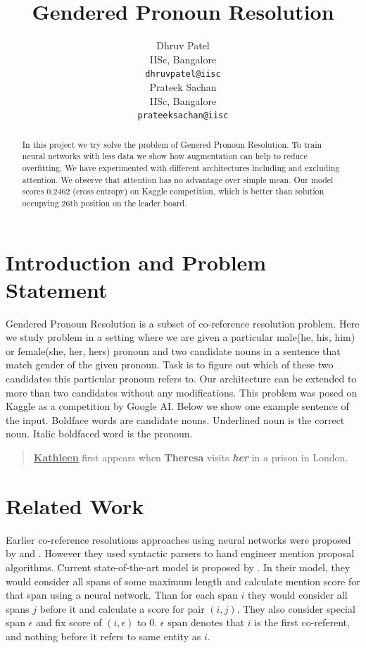 \documentclass[11pt,a4paper]{article}
\title{Gendered Pronoun Resolution}
\author{Dhruv Patel \\
  IISc, Bangalore \\
  \texttt{dhruvpatel@iisc} \\\And
  Prateek Sachan \\
  IISc, Bangalore \\
  \texttt{prateeksachan@iisc} \\}
\date{}
\begin{document}
\maketitle
\begin{abstract}
  In this project we try solve the problem of Genered  Pronoun Resolution. To train neural networks with less data we show how augmentation can help to reduce overfitting. We have experimented with different architectures including and excluding attention. We observe that attention has no advantage over simple mean. Our model scores 0.2462 (cross entropy) on Kaggle competition, which is better than solution occupying 26th position on the leader board.
\end{abstract}

\section{Introduction and Problem Statement}
Gendered Pronoun Resolution is a subset of co-reference resolution problem. Here we study problem in a setting where we are given a particular male(he, his, him) or female(she, her, hers) pronoun and two candidate nouns in a sentence that match gender of the given pronoun. Task is to figure out which of these two candidates this particular pronoun refers to.  Our architecture can be extended to more than two candidates without any modifications. This problem was posed on Kaggle as a competition by Google AI. Below we show one example sentence of the input. Boldface words are candidate nouns. Underlined noun is the correct noun. Italic boldfaced word is the pronoun.
\begin{quote}
   \textbf{\underline{Kathleen}} first appears when \textbf{Theresa} visits \textbf{\textit{her}} in a prison in London.
\end{quote}

\section{Related Work}
Earlier co-reference resolutions approaches using neural networks were proposed by \citet{wiseman2016learning} and \citet{clarkmanning2016deep}. However they used syntactic parsers to hand engineer mention proposal algorithms. Current state-of-the-art model is proposed by \citet{lee2017end}. In their model, they would consider all spans of some maximum length and calculate mention score for that span using a neural network. Than for each span $i$ they would consider all spans $j$ before it and calculate a score for pair $(i, j)$. They also consider special span $\epsilon$ and fix score of $(i, \epsilon)$ to 0. $\epsilon$ span denotes that $i$ is the first co-referent, and nothing before it refers to same entity as $i$.
\end{document}
